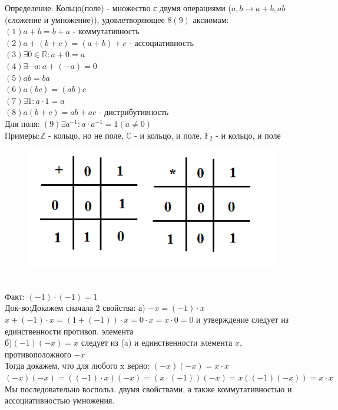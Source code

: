 \documentclass[12pt, oneside]{book}
\theoremstyle{definition}
\newcommand{\bb}[1]{\mathbb{#1}}
\begin{document}
\begin{enumerate}
Определение: Кольцо(поле) - множество с двумя операциями
($a, b \longrightarrow a+b, ab$ (сложение и умножение)), удовлетворяющее $8(9)$ аксиомам:\\
$(1)a+b = b+a$ - коммутативность \\
$(2)a+(b+c) = (a+b)+c$ - ассоциативность\\
$(3) \exists 0 \in \bb{R}: a+0 = a$\\
$(4) \exists -a: a+(-a) = 0$\\
$(5)ab=ba$\\
$(6)a(bc)=(ab)c$\\
$(7) \exists 1: a\cdot 1 = a$\\
$(8)a(b+c) = ab+ac$ - дистрибутивность\\
Для поля: $(9) \exists a^{-1}: a\cdot a^{-1} = 1 (a\neq 0)$\\
Примеры:$\bb{Z}$ - кольцо, но не поле, $\mathbb{C}$ - и кольцо, и поле, ${\bb{F}}_2$ - и кольцо, и поле\\
\begin{figure}[h!]
\centering
\includegraphics[scale=0.6]{1-1.PNG}
\end{figure}\\
Факт: $(-1)\cdot(-1) = 1$ \\
Док-во:Докажем сначала 2 свойства:
а) $-x = (-1)\cdot x$\\
$x+(-1)\cdot x = (1+(-1))\cdot x = 0\cdot x = x\cdot 0 = 0$ и утверждение следует из единственности противоп. элемента\\
б)$(-1)(-x) = x$ следует из (a) и единственности элемента $x$, противоположного $-x$\\
Тогда докажем, что для любого x верно:
$(-x)(-x) = x\cdot x$\\
$(-x)(-x) = ((-1)\cdot x)(-x)=(x\cdot (-1))(-x) = x((-1)(-x)) = x\cdot x$\\
Мы последовательно воспольз. двумя свойствами, а также коммутативностью и ассоциативностью умножения. \\

\end{enumerate}
\end{document}
